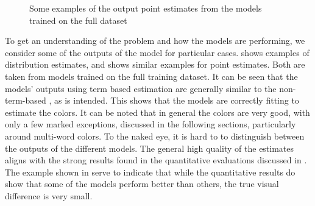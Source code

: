 \documentclass[11pt,a4paper]{article}
\begin{document}
\begin{figure}
	\caption{Some examples of the output point estimates from the models trained on the full dataset} \label{fig:pointout}
\end{figure}


To get an understanding of the problem and how the models are performing, we consider some of the outputs of the model for particular cases.
 shows examples of distribution estimates, and 
 shows similar examples for point estimates.
Both  are  taken  from models trained on  the full training dataset.
It can be seen that the models' outputs using term based estimation are generally similar to the non-term-based \empmodel{}, as is intended.
This shows that the models are correctly fitting to estimate the colors.
It can be noted  that  in general the  colors  are  very good, with  only a few marked exceptions,   discussed in the  following sections, particularly around multi-word colors.
To  the naked  eye,  it is hard to to distinguish  between the outputs of the different models.
The general high quality of the estimates aligns with the strong results found in the quantitative evaluations discussed in .
The example shown  in  serve  to indicate that while the  quantitative results do show that some of the models perform better than  others, the  true visual difference is very small.
\end{document}
